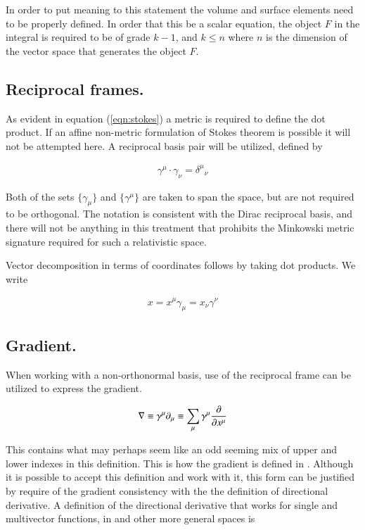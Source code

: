 In order to put meaning to this statement the volume and surface elements need to be properly defined.  In order that this be a scalar equation, the object $F$ in the integral is required to be of grade $k-1$, and $k \le n$ where $n$ is the dimension of the vector space that generates the object $F$.

\subsection{Reciprocal frames.}

As evident in equation (\ref{eqn:stokes}) a metric is required to define the dot product.  If an affine non-metric formulation
of Stokes theorem is possible it will not be attempted here.  A reciprocal basis pair will be utilized, defined by

\begin{align}
\gamma^\mu \cdot \gamma_\nu = {\delta^\mu}_\nu
\end{align}

Both of the sets $\{\gamma_\mu\}$ and $\{\gamma^\mu\}$ are taken to span the space, but are not required to be orthogonal.  The notation is consistent with the Dirac reciprocal basis, and there will not be anything in this treatment that prohibits the Minkowski metric signature required for such a relativistic space.

Vector decomposition in terms of coordinates follows by taking dot products.  We write

\begin{align}
x = x^\mu \gamma_\mu = x_\nu \gamma^\nu
\end{align}

\subsection{Gradient.}

When working with a non-orthonormal basis, use of the reciprocal frame can be utilized to express the gradient.

\begin{align}
\nabla \equiv \gamma^\mu \partial_\mu \equiv \sum_\mu \gamma^\mu \frac{\partial {}}{\partial {x^\mu}}
\end{align}

This contains what may perhaps seem like an odd seeming mix of upper and lower indexes in this definition.  This is how the gradient is defined in \cite{doran2003gap}.  Although it is possible to accept this definition and work with it, this form can be justified by require of the gradient consistency with the the definition of directional derivative.  A definition of the directional derivative that works for single and multivector functions, in  and other more general spaces is

